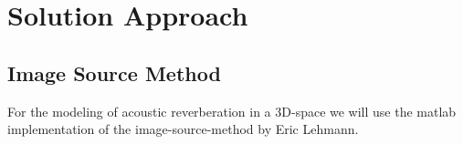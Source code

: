 \chapter{Solution Approach}
\label{chap:approach}

\section{Image Source Method}
For the modeling of acoustic reverberation in a 3D-space we will use the matlab implementation of the image-source-method by Eric Lehmann.\cite{}